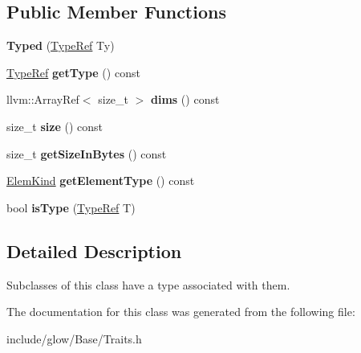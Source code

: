 \subsection*{Public Member Functions}
\begin{DoxyCompactItemize}
\item 
\mbox{\label{classglow_1_1_typed_af24df121312d899c04ab748396717164}} 
{\bfseries Typed} (\hyperlink{structglow_1_1_type}{Type\+Ref} Ty)
\item 
\mbox{\label{classglow_1_1_typed_a288428fd9d86e922f8e8850c73c92a8b}} 
\hyperlink{structglow_1_1_type}{Type\+Ref} {\bfseries get\+Type} () const
\item 
\mbox{\label{classglow_1_1_typed_aff007e62153b7de2916fb956169d66a2}} 
llvm\+::\+Array\+Ref$<$ size\+\_\+t $>$ {\bfseries dims} () const
\item 
\mbox{\label{classglow_1_1_typed_a993e37bf961ac2cd30c423db27702ddb}} 
size\+\_\+t {\bfseries size} () const
\item 
\mbox{\label{classglow_1_1_typed_a568dd321425ffa9a8b49cdb4bdf4e042}} 
size\+\_\+t {\bfseries get\+Size\+In\+Bytes} () const
\item 
\mbox{\label{classglow_1_1_typed_a3b95fc860f3ce3b64320cdc99d817753}} 
\hyperlink{namespaceglow_ab92e14a94329daf4083db670e95fbcdf}{Elem\+Kind} {\bfseries get\+Element\+Type} () const
\item 
\mbox{\label{classglow_1_1_typed_af5f49e1a41c93cc4aba3a952043241d7}} 
bool {\bfseries is\+Type} (\hyperlink{structglow_1_1_type}{Type\+Ref} T)
\end{DoxyCompactItemize}


\subsection{Detailed Description}
Subclasses of this class have a type associated with them. 

The documentation for this class was generated from the following file\+:\begin{DoxyCompactItemize}
\item 
include/glow/\+Base/Traits.\+h\end{DoxyCompactItemize}
